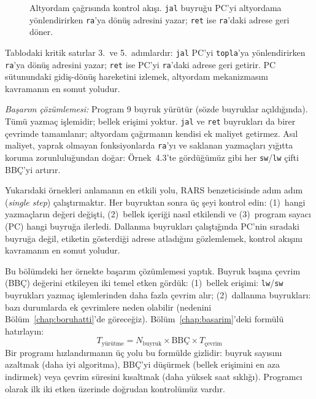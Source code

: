 \begin{ornek}[4.6]
\begin{figure}[H]
\caption[Altyordam çağrısında kontrol akışı]{Altyordam çağrısında kontrol akışı. \texttt{jal} buyruğu PC'yi altyordama yönlendirirken \texttt{ra}'ya dönüş adresini yazar; \texttt{ret} ise \texttt{ra}'daki adrese geri döner.}
\label{fig:altyordam-akis}
\end{figure}

Tablodaki kritik satırlar 3.~ve 5.~adımlardır: \texttt{jal} PC'yi \texttt{topla}'ya yönlendirirken \texttt{ra}'ya dönüş adresini yazar; \texttt{ret} ise PC'yi \texttt{ra}'daki adrese geri getirir. PC sütunundaki gidiş-dönüş hareketini izlemek, altyordam mekanizmasını kavramanın en somut yoludur.

\emph{Başarım çözümlemesi:} Program 9 buyruk yürütür (sözde buyruklar açıldığında). Tümü yazmaç işlemidir; bellek erişimi yoktur. \texttt{jal} ve \texttt{ret} buyrukları da birer çevrimde tamamlanır; altyordam çağırmanın kendisi ek maliyet getirmez. Asıl maliyet, yaprak olmayan fonksiyonlarda \texttt{ra}'yı ve saklanan yazmaçları yığıtta koruma zorunluluğundan doğar: Örnek~4.3'te gördüğümüz gibi her \texttt{sw}/\texttt{lw} çifti BBÇ'yi artırır.
\end{ornek}

\begin{bilginot}
Yukarıdaki örnekleri anlamanın en etkili yolu, RARS benzeticisinde adım adım (\emph{single step}) çalıştırmaktır. Her buyruktan sonra üç şeyi kontrol edin: (1)~hangi yazmaçların değeri değişti, (2)~bellek içeriği nasıl etkilendi ve (3)~program sayacı (PC) hangi buyruğa ilerledi. Dallanma buyrukları çalıştığında PC'nin sıradaki buyruğa değil, etiketin gösterdiği adrese atladığını gözlemlemek, kontrol akışını kavramanın en somut yoludur.
\end{bilginot}

\begin{bilginot}
Bu bölümdeki her örnekte başarım çözümlemesi yaptık. Buyruk başına çevrim (BBÇ) değerini etkileyen iki temel etken gördük: (1)~bellek erişimi: \texttt{lw}/\texttt{sw} buyrukları yazmaç işlemlerinden daha fazla çevrim alır; (2)~dallanma buyrukları: bazı durumlarda ek çevrimlere neden olabilir (nedenini Bölüm~\ref{chap:boruhatti}'de göreceğiz). Bölüm~\ref{chap:basarim}'deki formülü hatırlayın:
\[
T_{\text{yürütme}} = N_{\text{buyruk}} \times \text{BBÇ} \times T_{\text{çevrim}}
\]
Bir programı hızlandırmanın üç yolu bu formülde gizlidir: buyruk sayısını azaltmak (daha iyi algoritma), BBÇ'yi düşürmek (bellek erişimini en aza indirmek) veya çevrim süresini kısaltmak (daha yüksek saat sıklığı). Programcı olarak ilk iki etken üzerinde doğrudan kontrolümüz vardır.
\end{bilginot}

